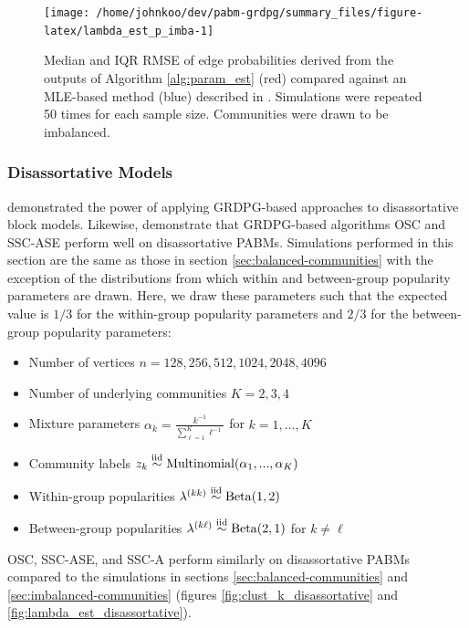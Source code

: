 \documentclass[
  12pt,
]{article}
\providecommand{\tightlist}{%
  \setlength{\itemsep}{0pt}\setlength{\parskip}{0pt}}
\theoremstyle{definition}
\theoremstyle{definition}
\theoremstyle{definition}
\theoremstyle{definition}
\theoremstyle{remark}
\begin{document}
\begin{figure}[H]
{\centering \texttt{[image: /home/johnkoo/dev/pabm-grdpg/summary\_files/figure-latex/lambda\_est\_p\_imba-1]}
}
\caption{Median and IQR RMSE of edge probabilities derived from the
outputs of Algorithm \ref{alg:param_est} (red) compared against an
MLE-based method (blue) described in
\cite{307cbeb9b1be48299388437423d94bf1}.
Simulations were repeated 50 times for each sample size. Communities were drawn to be imbalanced.}
\label{fig:lambda_est_p_imba}
\end{figure}

\hypertarget{sec:disassortative-models}{%
\subsubsection{Disassortative Models}\label{sec:disassortative-models}}

\citet{rubindelanchy2017statistical} demonstrated the power of applying GRDPG-based approaches to disassortative block models.
Likewise, demonstrate that GRDPG-based algorithms OSC and SSC-ASE perform well on disassortative PABMs.
Simulations performed in this section are the same as those in section \ref{sec:balanced-communities} with the exception of the distributions from which within and between-group popularity parameters are drawn.
Here, we draw these parameters such that the expected value is \(1/3\) for the within-group popularity parameters and \(2/3\) for the between-group popularity parameters:

\begin{itemize}
\tightlist
\item
Number of vertices \(n = 128, 256, 512, 1024, 2048, 4096\)
\item
Number of underlying communities \(K = 2, 3, 4\)
\item
Mixture parameters \(\alpha_k = \frac{k^{-1}}{\sum_{\ell=1}^K \ell^{-1}}\)
for \(k = 1, ..., K\)
\item
Community labels
\(z_k \stackrel{\text{iid}}{\sim} \mathrm{Multinomial}(\alpha_1, ..., \alpha_K)\)
\item
Within-group popularities
\(\lambda^{(kk)} \stackrel{\text{iid}}{\sim} \mathrm{Beta}(1, 2)\)
\item
Between-group popularities
\(\lambda^{(k \ell)} \stackrel{\text{iid}}{\sim} \mathrm{Beta}(2, 1)\) for
\(k \neq \ell\)
\end{itemize}

OSC, SSC-ASE, and SSC-A perform similarly on disassortative PABMs compared to the simulations in sections \ref{sec:balanced-communities} and \ref{sec:imbalanced-communities}
(figures \ref{fig:clust_k_disassortative} and \ref{fig:lambda_est_disassortative}).
\end{document}
